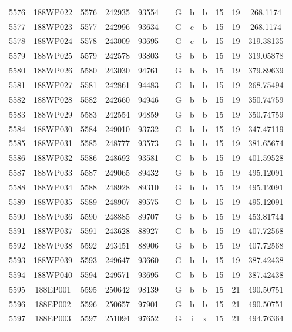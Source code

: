 \begin{tabular}{|*{12}{c|}}
5576 & 188WP022 & 5576 & 242935 & 93554 &  & G & b & b & 15 & 19 & 268.1174 \\ 
5577 & 188WP023 & 5577 & 242996 & 93634 &  & G & c & b & 15 & 19 & 268.1174 \\ 
5578 & 188WP024 & 5578 & 243009 & 93695 &  & G & c & b & 15 & 19 & 319.38135 \\ 
5579 & 188WP025 & 5579 & 242578 & 93803 &  & G & b & b & 15 & 19 & 319.05878 \\ 
5580 & 188WP026 & 5580 & 243030 & 94761 &  & G & b & b & 15 & 19 & 379.89639 \\ 
5581 & 188WP027 & 5581 & 242861 & 94483 &  & G & b & b & 15 & 19 & 268.75494 \\ 
5582 & 188WP028 & 5582 & 242660 & 94946 &  & G & b & b & 15 & 19 & 350.74759 \\ 
5583 & 188WP029 & 5583 & 242554 & 94859 &  & G & b & b & 15 & 19 & 350.74759 \\ 
5584 & 188WP030 & 5584 & 249010 & 93732 &  & G & b & b & 15 & 19 & 347.47119 \\ 
5585 & 188WP031 & 5585 & 248777 & 93573 &  & G & b & b & 15 & 19 & 381.65674 \\ 
5586 & 188WP032 & 5586 & 248692 & 93581 &  & G & b & b & 15 & 19 & 401.59528 \\ 
5587 & 188WP033 & 5587 & 249065 & 89432 &  & G & b & b & 15 & 19 & 495.12091 \\ 
5588 & 188WP034 & 5588 & 248928 & 89310 &  & G & b & b & 15 & 19 & 495.12091 \\ 
5589 & 188WP035 & 5589 & 248907 & 89575 &  & G & b & b & 15 & 19 & 495.12091 \\ 
5590 & 188WP036 & 5590 & 248885 & 89707 &  & G & b & b & 15 & 19 & 453.81744 \\ 
5591 & 188WP037 & 5591 & 243628 & 88927 &  & G & b & b & 15 & 19 & 407.72568 \\ 
5592 & 188WP038 & 5592 & 243451 & 88906 &  & G & b & b & 15 & 19 & 407.72568 \\ 
5593 & 188WP039 & 5593 & 249647 & 93660 &  & G & b & b & 15 & 19 & 387.42438 \\ 
5594 & 188WP040 & 5594 & 249571 & 93695 &  & G & b & b & 15 & 19 & 387.42438 \\ 
5595 & 188EP001 & 5595 & 250642 & 98139 &  & G & b & b & 15 & 21 & 490.50751 \\ 
5596 & 188EP002 & 5596 & 250657 & 97901 &  & G & b & b & 15 & 21 & 490.50751 \\ 
5597 & 188EP003 & 5597 & 251094 & 97652 &  & G & i & x & 15 & 21 & 494.76364 \\ 

\end{tabular}

